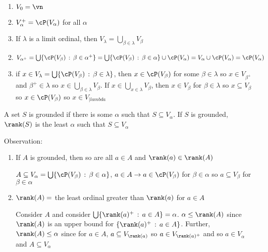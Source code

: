 \begin{theorem}
    \begin{enumerate}[label = (\alph*)]
        \item $V_0 = \vn$ 
        \item $V_{\alpha}^+ = \cP(V_{\alpha})$ for all $\alpha$ 
        \item If $\lambda$ is a limit ordinal, then $V_{\lambda} = \bigcup_{\beta \in \lambda}V_{\beta}$ 
    \end{enumerate}
\end{theorem}

\begin{pf}
    \begin{enumerate}[label = (\roman*)]
        \setcounter{enumi}{1}
        \item $V_{\alpha^+} = \bigcup \{\cP(V_{\beta}) \, : \, \beta \in \alpha^+\} = \bigcup\{\cP(V_{\beta}) \, : \, \beta \in \alpha\} \cup \cP(V_{\alpha}) = V_{\alpha} \cup \cP(V_{\alpha}) = \cP(V_{\alpha})$ 
        \item if $x \in V_{\lambda} = \bigcup\{\cP(V_{\beta}) \, : \, \beta \in \lambda\}$, then $x \in \cP(V_{\beta})$ for some $\beta \in \lambda$ so $x \in V_{\beta^+}$ and $\beta^+ \in \lambda$ so $x \in \bigcup_{\beta \in \lambda} V_{\beta}$. If $x \in \bigcup_{x \in \lambda} V_{\beta}$, then $x \in V_{\beta}$ for $\beta \in \lambda$ so $x \subseteq V_{\beta}$ so $x \in \cP(V_{\beta})$ so $x \in V_{|lambda}$ 
    \end{enumerate}
\end{pf}

\begin{definition}
    A set $S$ is grounded if there is some $\alpha$ such that $S \subseteq V_{\alpha}$. If $S$ is grounded, $\rank(S)$ is the least $\alpha$ such that $S \subseteq V_{\alpha}$ 
\end{definition}

Observation: 
\begin{enumerate}[label = (\roman*)]
    \item If $A$ is grounded, then so are all $a \in A$ and $\rank(a) \in \rank(A)$ 
    \begin{pf} $A \subseteq V_{\alpha} = \bigcup \{ \cP(V_{\beta}) \, : \, \beta \in \alpha\}$, $a \in A \to a \in \cP(V_{\beta})$ for $\beta \in \alpha$ so $a \subseteq V_{\beta}$ for $\beta \in \alpha$ 
    \end{pf}
    \item $\rank(A)=$ the least ordinal greater than $\rank(a)$ for $a \in A$ 
    \begin{pf}
        Consider $A$ and consider $\bigcup \{ \rank(a)^+ \, : \, a \in A\} = \alpha$. $\alpha \le \rank(A)$ since $\rank(A)$ is an upper bound for $\{\rank(a)^+ \, : \, a \in A\}$. Further, $\rank(A) \le \alpha$ since for $a \in A$, $a \subseteq V_{\rank(a)}$ so $a \in V_{\rank(a)^+}$ and so $a \in V_{\alpha}$ and $A \subseteq V_{\alpha}$ 
    \end{pf}
\end{enumerate}


